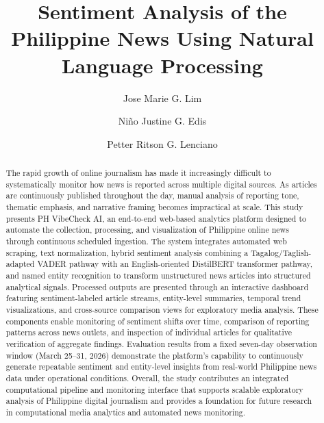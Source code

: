 \documentclass[sigconf, nonacm]{acmart}
\begin{document}
\title[]{Sentiment Analysis of the Philippine News Using Natural Language Processing}

\author{Jose Marie G. Lim}

\author{Niño Justine G. Edis}

\author{Petter Ritson G. Lenciano}

\begin{abstract}
The rapid growth of online journalism has made it increasingly difficult to systematically monitor how news is reported across multiple digital sources. As articles are continuously published throughout the day, manual analysis of reporting tone, thematic emphasis, and narrative framing becomes impractical at scale. This study presents PH VibeCheck AI, an end-to-end web-based analytics platform designed to automate the collection, processing, and visualization of Philippine online news through continuous scheduled ingestion. The system integrates automated web scraping, text normalization, hybrid sentiment analysis combining a Tagalog/Taglish-adapted VADER pathway with an English-oriented DistilBERT transformer pathway, and named entity recognition to transform unstructured news articles into structured analytical signals. Processed outputs are presented through an interactive dashboard featuring sentiment-labeled article streams, entity-level summaries, temporal trend visualizations, and cross-source comparison views for exploratory media analysis. These components enable monitoring of sentiment shifts over time, comparison of reporting patterns across news outlets, and inspection of individual articles for qualitative verification of aggregate findings. Evaluation results from a fixed seven-day observation window (March 25–31, 2026) demonstrate the platform’s capability to continuously generate repeatable sentiment and entity-level insights from real-world Philippine news data under operational conditions. Overall, the study contributes an integrated computational pipeline and monitoring interface that supports scalable exploratory analysis of Philippine digital journalism and provides a foundation for future research in computational media analytics and automated news monitoring.
\end{abstract}
\end{document}

